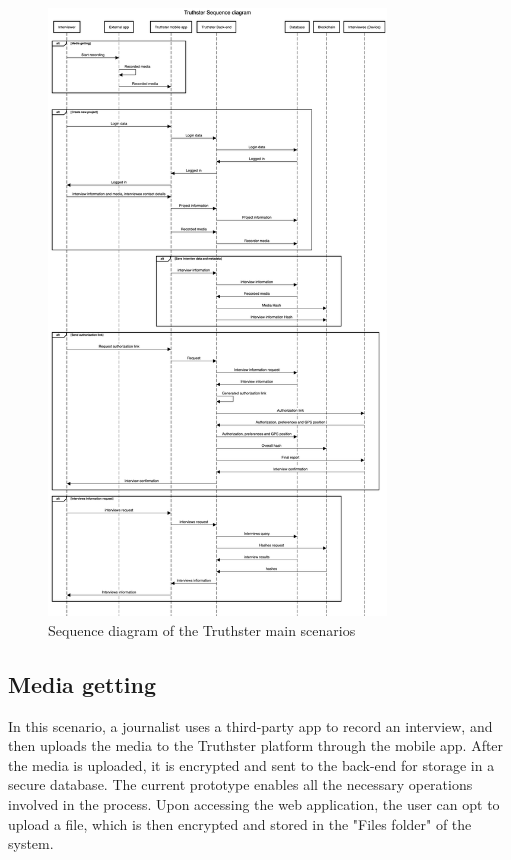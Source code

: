 \documentclass[target=mst,aauheader=]{thud}
\begin{document}
\begin{figure}
    \centering
    \includegraphics[width=0.8\textwidth]{images/sequenceDiagram.png}
    \caption{Sequence diagram of the Truthster main scenarios}
    \label{fig:sequenceDiagram}
\end{figure}

\subsection{Media getting}
\label{mediaGetting}

In this scenario, a journalist uses a third-party app to record an interview, and then uploads the media to the Truthster platform through the mobile app. After the media is uploaded, it is encrypted and sent to the back-end for storage in a secure database. The current prototype enables all the necessary operations involved in the process. Upon accessing the web application, the user can opt to upload a file, which is then encrypted and stored in the "Files folder" of the system.
\end{document}
